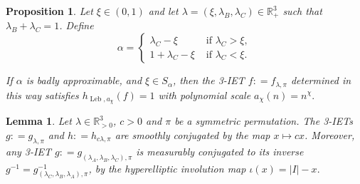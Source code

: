 \documentclass[oneside]{amsart}
\theoremstyle{plain}
\newtheorem{PROP}[THM]{Proposition}
\newtheorem{LEM}[THM]{Lemma}
\theoremstyle{definition}
\DeclareMathOperator{\Leb}{Leb}
\newcommand{\dfn}{\mathrel{\mathop:}=}
\newcommand{\<}{\langle}
\renewcommand{\>}{\rangle}
\newcommand{\R}{\mathbb{R}}
\renewcommand{\|}{|\!|} %
\begin{document}
\begin{PROP}
\label{prop:KeyProp}
    Let $\xi \in (0,1)$ and let $\lambda = (\xi,\lambda_B,\lambda_C) \in \R^3_+$  such that $\lambda_B+\lambda_C = 1$. Define 
    \begin{equation*} 
        \alpha = 
            \left\{
            \begin{array}{cc}
         \lambda_C - \xi & \text{ if } \lambda_C >\xi,  \\
         1+ \lambda_C - \xi & \text{ if } \lambda_C < \xi.
            \end{array}
            \right.
    \end{equation*} 
    
    If $\alpha$ is badly approximable, and $\xi \in S_\alpha$,
    then the 3-IET $f \dfn f_{\lambda,\pi}$ determined in this way satisfies $h_{\Leb,a_\chi}(f)=1$ with polynomial scale $a_\chi(n) = n^\chi.$
\end{PROP}

\begin{LEM}
\label{lem:ietEquiv}
Let $\lambda \in \R^3_{>0}$, $c > 0$ and $\pi$ be a symmetric permutation. The 3-IETs $g \dfn g_{\lambda,\pi}$ and $h \dfn h_{c\lambda,\pi}$ are smoothly conjugated by the map $x \mapsto cx$. 
Moreover, any 3-IET $g \dfn g_{(\lambda_A,\lambda_B,\lambda_C),\pi}$ is measurably conjugated to its inverse $g^{-1} = g^{-1}_{(\lambda_C,\lambda_B,\lambda_A),\pi}$, by the hyperelliptic involution map $\iota(x) = |I| - x.$
\end{LEM}
\end{document}
